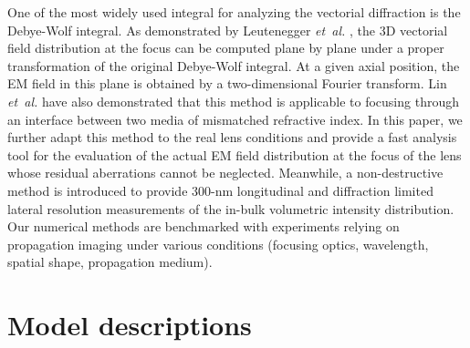 \documentclass[9pt,twocolumn,twoside]{osajnl}
\begin{document}
One of the most widely used integral for analyzing the vectorial diffraction is the Debye-Wolf integral. As demonstrated by Leutenegger \emph{et~al.} \cite{leutenegger2006fast}, the 3D vectorial field distribution at the focus can be computed plane by plane under a proper transformation of the original Debye-Wolf integral. At a given axial position, the EM field in this plane is obtained by a two-dimensional Fourier transform. Lin \emph{et~al.} \cite{Lin2012} have also demonstrated that this method is applicable to focusing through an interface between two media of mismatched refractive index. In this paper, we further adapt this method to the real lens conditions and provide a fast analysis tool for the evaluation of the actual EM field distribution at the focus of the lens whose residual aberrations cannot be neglected. Meanwhile, a non-destructive method is introduced to provide 300-nm longitudinal and diffraction limited lateral resolution measurements of the in-bulk volumetric intensity distribution. Our numerical methods are benchmarked with experiments relying on propagation imaging under various conditions (focusing optics, wavelength, spatial shape, propagation medium).




\section{Model descriptions} \label{section:2}
\end{document}
